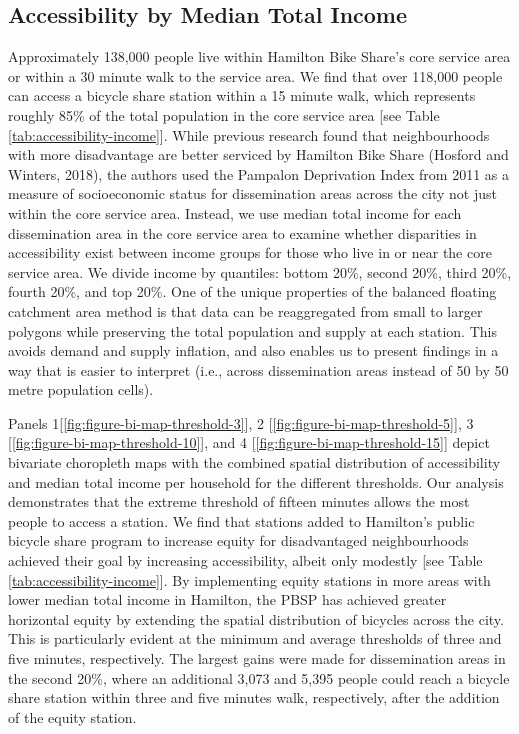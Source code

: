 \documentclass[]{elsarticle} %
\begin{document}
\hypertarget{accessibility-by-median-total-income}{%
\subsection{Accessibility by Median Total
Income}\label{accessibility-by-median-total-income}}

Approximately 138,000 people live within Hamilton Bike Share's core
service area or within a 30 minute walk to the service area. We find
that over 118,000 people can access a bicycle share station within a 15
minute walk, which represents roughly 85\% of the total population in
the core service area {[}see Table \ref{tab:accessibility-income}{]}.
While previous research found that neighbourhoods with more disadvantage
are better serviced by Hamilton Bike Share (Hosford and Winters, 2018),
the authors used the Pampalon Deprivation Index from 2011 as a measure
of socioeconomic status for dissemination areas across the city not just
within the core service area. Instead, we use median total income for
each dissemination area in the core service area to examine whether
disparities in accessibility exist between income groups for those who
live in or near the core service area. We divide income by quantiles:
bottom 20\%, second 20\%, third 20\%, fourth 20\%, and top 20\%. One of
the unique properties of the balanced floating catchment area method is
that data can be reaggregated from small to larger polygons while
preserving the total population and supply at each station. This avoids
demand and supply inflation, and also enables us to present findings in
a way that is easier to interpret (i.e., across dissemination areas
instead of 50 by 50 metre population cells).

Panels 1{[}\ref{fig:figure-bi-map-threshold-3}{]}, 2
{[}\ref{fig:figure-bi-map-threshold-5}{]}, 3
{[}\ref{fig:figure-bi-map-threshold-10}{]}, and 4
{[}\ref{fig:figure-bi-map-threshold-15}{]} depict bivariate choropleth
maps with the combined spatial distribution of accessibility and median
total income per household for the different thresholds. Our analysis
demonstrates that the extreme threshold of fifteen minutes allows the
most people to access a station. We find that stations added to
Hamilton's public bicycle share program to increase equity for
disadvantaged neighbourhoods achieved their goal by increasing
accessibility, albeit only modestly {[}see Table
\ref{tab:accessibility-income}{]}. By implementing equity stations in
more areas with lower median total income in Hamilton, the PBSP has
achieved greater horizontal equity by extending the spatial distribution
of bicycles across the city. This is particularly evident at the minimum
and average thresholds of three and five minutes, respectively. The
largest gains were made for dissemination areas in the second 20\%,
where an additional 3,073 and 5,395 people could reach a bicycle share
station within three and five minutes walk, respectively, after the
addition of the equity station.
\end{document}
